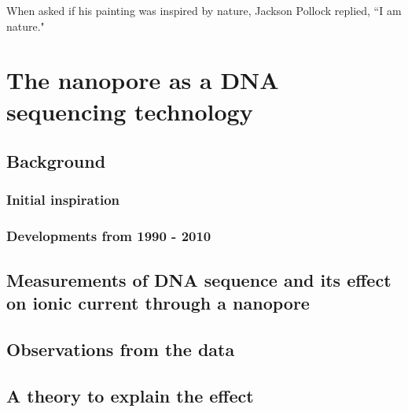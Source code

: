 \begin{savequote}[75mm]
When asked if his painting was inspired by nature, Jackson Pollock replied, ``I am nature."
\end{savequote}

\chapter{The nanopore as a DNA sequencing technology}
\label{dna_sequencing}

\section{Background}

\subsection{Initial inspiration}

\subsection{Developments from 1990 - 2010}

\section{Measurements of DNA sequence and its effect on ionic current through a nanopore}

\section{Observations from the data}

\section{A theory to explain the effect}